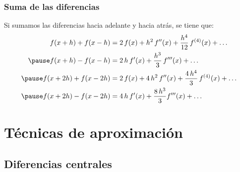 \documentclass[12pt]{beamer}
\begin{document}
\begin{frame}
\frametitle{Suma de las diferencias}
Si sumamos las diferencias hacia adelante y hacia atrás, se tiene que:
\pause
\begin{eqnarray*}
\begin{aligned}
f (x + h) + f (x - h) &= 2 \, f (x) + h^{2} \, \sderivada{f} (x) + \dfrac{h^{4}}{12} \, f^{(4)}(x) + \ldots \\ \pause
f (x + h) - f (x - h) &= 2 \, h \, \pderivada{f} (x) + \dfrac{h^{3}}{3} \, \tderivada{f} (x) + \ldots \\ \pause
f (x + 2 h) + f ( x - 2 h) &= 2 \, f (x) + 4 \, h^{2} \, \sderivada{f} (x) + \dfrac{4 \, h^{4}}{3} \, f^{(4)} (x) +\ldots \\ \pause
f (x + 2 h) - f (x - 2 h) &= 4 \, h \, \pderivada{f} (x) + \dfrac{8 \, h^{3}}{3} \tderivada{f} (x) + \ldots
\end{aligned}
\end{eqnarray*}
\end{frame}

\section{Técnicas de aproximación}
\subsection{Diferencias centrales}
\end{document}
